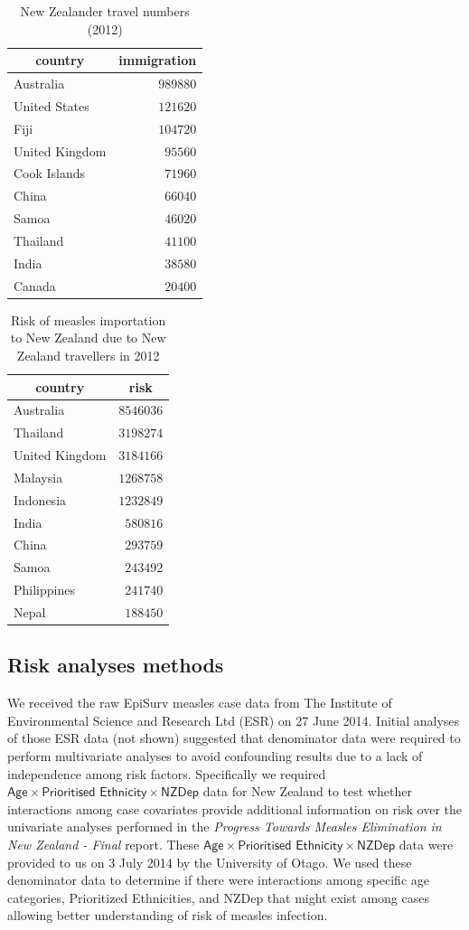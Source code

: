 \documentclass{article}
\begin{document}
\begin{table}
\caption{New Zealander travel numbers (2012)}
\begin{center}
\begin{tabular}{lr}
\hline\hline
\multicolumn{1}{c}{country}&\multicolumn{1}{c}{immigration}\tabularnewline
\hline
Australia&$989880$\tabularnewline
United States&$121620$\tabularnewline
Fiji&$104720$\tabularnewline
United Kingdom&$ 95560$\tabularnewline
Cook Islands&$ 71960$\tabularnewline
China&$ 66040$\tabularnewline
Samoa&$ 46020$\tabularnewline
Thailand&$ 41100$\tabularnewline
India&$ 38580$\tabularnewline
Canada&$ 20400$\tabularnewline
\hline
\end{tabular}\end{center}\label{table:nztravel12}
\end{table}


\begin{table}
\caption{Risk of measles importation to New Zealand due to New Zealand travellers in 2012}
\begin{center}
\begin{tabular}{lr}
\hline\hline
\multicolumn{1}{c}{country}&\multicolumn{1}{c}{risk}\tabularnewline
\hline
Australia&$8546036$\tabularnewline
Thailand&$3198274$\tabularnewline
United Kingdom&$3184166$\tabularnewline
Malaysia&$1268758$\tabularnewline
Indonesia&$1232849$\tabularnewline
India&$ 580816$\tabularnewline
China&$ 293759$\tabularnewline
Samoa&$ 243492$\tabularnewline
Philippines&$ 241740$\tabularnewline
Nepal&$ 188450$\tabularnewline
\hline
\end{tabular}\end{center}\label{table:nzrisk12}
\end{table}



\subsection{Risk analyses methods}
We received the raw EpiSurv measles case data from The Institute of Environmental Science and Research Ltd (ESR) on 27 June 2014. Initial analyses of those ESR data (not shown) suggested that denominator data were required to perform multivariate analyses to avoid confounding results due to a lack of independence among risk factors. Specifically we required $\textsf{Age} \times \textsf{Prioritised Ethnicity} \times \textsf{NZDep}$ data for New Zealand to test whether interactions among case covariates provide additional information on risk over the univariate analyses performed in the \emph{Progress Towards Measles Elimination in New Zealand - Final} report. These $\textsf{Age} \times \textsf{Prioritised Ethnicity} \times \textsf{NZDep}$ data were provided to us on 3 July 2014 by the University of Otago. We used these denominator data to determine if there were interactions among specific age categories, Prioritized Ethnicities, and NZDep that might exist among cases allowing better understanding of risk of measles infection.
\end{document}
